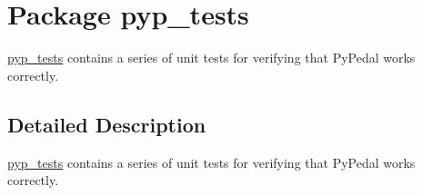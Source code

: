 \hypertarget{namespacepyp__tests}{
\section{Package pyp\_\-tests}
\label{namespacepyp__tests}
}
\hyperlink{namespacepyp__tests}{pyp\_\-tests} contains a series of unit tests for verifying that Py\-Pedal works correctly.  




\subsection{Detailed Description}
\hyperlink{namespacepyp__tests}{pyp\_\-tests} contains a series of unit tests for verifying that Py\-Pedal works correctly. 